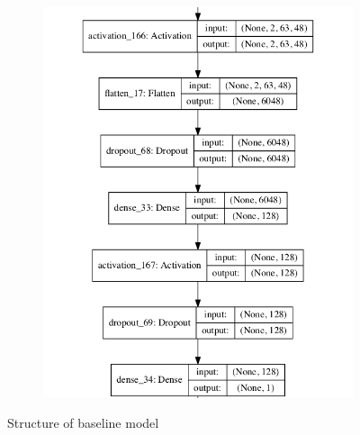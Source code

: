 \begin{figure}[htbp]
\begin{subfigure}[b]{0.5\linewidth}
		  \includegraphics[scale=0.35]{Figs/Appen/simple_model_plot2.png}
     \end{subfigure}
  \caption{Structure of baseline model}
  \label{Fig:shapebaseline}
\end{figure}
